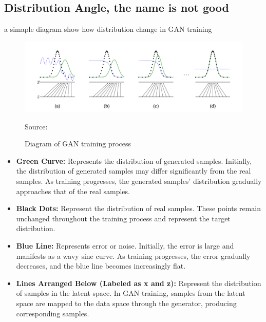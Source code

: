 \subsection*{Distribution Angle, the name is not good}
a simaple diagram show how distribution change in GAN training


\begin{figure}[H]
    \centering
    \includegraphics[width=1.2\linewidth]{./Images/data_distribution.jpg}
    \caption{Diagram of GAN training process}
    \label{fig:my_picture}
    \vspace{1pt} %
    \small{Source: \cite{goodfellow2014generative}}
\end{figure}


\begin{itemize}
    \item \textbf{ Green Curve:} Represents the distribution of generated samples. Initially, the distribution of generated samples may differ significantly from the real samples. As training progresses, the generated samples’ distribution gradually approaches that of the real samples.
    \item \textbf{Black Dots:} Represent the distribution of real samples. These points remain unchanged throughout the training process and represent the target distribution.
    \item \textbf{ Blue Line:} Represents error or noise. Initially, the error is large and manifests as a wavy sine curve. As training progresses, the error gradually decreases, and the blue line becomes increasingly flat.
    \item \textbf{ Lines Arranged Below (Labeled as x and z):} Represent the distribution of samples in the latent space. In GAN training, samples from the latent space are mapped to the data space through the generator, producing corresponding samples.
\end{itemize}


